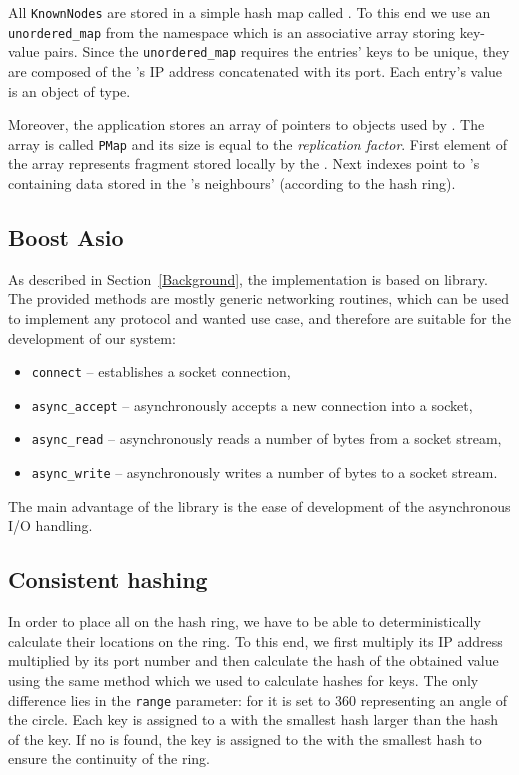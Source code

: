         All \texttt{KnownNodes} are stored in a simple hash map called \NodesMap. To this end we use an \texttt{unordered\_map} \cite{Unordered} from the \std namespace which is an associative array storing key-value pairs.
        Since the \texttt{unordered\_map} requires the entries' keys to be unique, they are composed of the \KnownNode's IP address concatenated with its port. Each entry's value is an object of \KnownNode type.
        
        Moreover, the application stores an array of pointers to \PHT objects used by \Node. The array is called \texttt{PMap} and its size is equal to the \textit{replication factor}. First element of the array represents \PHT fragment stored locally by the \Node.
        Next indexes point to \PHT's containing data stored in the \Node's neighbours' (according to the hash ring).

    \subsection{Boost Asio}
        As described in Section~\ref{Background}, the \DHTS implementation is based on \Asio library. The provided methods are mostly generic networking routines, which can be used to implement any protocol and wanted use case, and therefore are suitable for the development of our system:
        \begin{itemize}
            \item \texttt{connect} -- establishes a socket connection,
            \item \texttt{async\_accept} -- asynchronously accepts a new connection into a socket,
            \item \texttt{async\_read} -- asynchronously reads a number of bytes from a socket stream,
            \item \texttt{async\_write} -- asynchronously writes a number of bytes to a socket stream.
        \end{itemize}
        The main advantage of the \Asio library is the ease of development of the asynchronous I/O handling.
                
    \subsection{Consistent hashing} \label{ConsistentHashing}
        In order to place all \Nodes on the hash ring, we have to be able to deterministically calculate their locations on the ring. To this end, we first multiply its IP address multiplied by its port number and then calculate the hash of the obtained value using the same method which we used to calculate hashes for keys. The only difference lies in the \texttt{range} parameter: for \Nodes it is set to 360 representing an angle of the circle. Each key is assigned to a \Node with the smallest hash larger than the hash of the key. If no \Node is found, the key is assigned to the \Node with the smallest hash to ensure the continuity of the ring.
            
